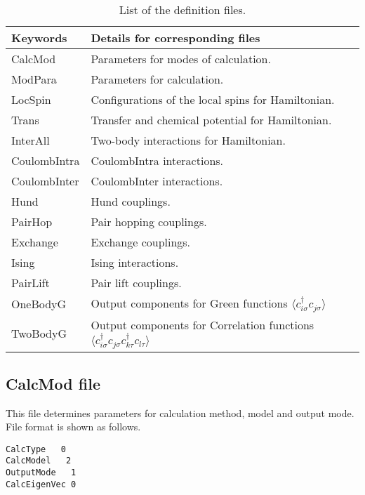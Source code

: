  \begin{table*}[h!]
\begin{center}
  \begin{tabular}{ll|} \hline
           Keywords     & Details for corresponding files       \\   \hline\hline
           CalcMod      &   Parameters for modes of calculation.  \\  \hline  
           ModPara       &  Parameters for calculation.        \\ \hline   
           LocSpin         &  Configurations of the local spins for Hamiltonian.         \\ 
           Trans       &   Transfer and chemical potential for Hamiltonian.  \\
           InterAll  &   Two-body interactions for Hamiltonian. \\  
           CoulombIntra  &   CoulombIntra interactions. \\  
           CoulombInter  &   CoulombInter  interactions. \\  
           Hund  &   Hund couplings. \\  
           PairHop  &  Pair hopping couplings. \\  
           Exchange  &  Exchange couplings. \\  
           Ising  &  Ising interactions. \\  
           PairLift  &   Pair lift couplings. \\  
           OneBodyG         &   Output components for Green functions $\langle c_{i\sigma}^{\dagger}c_{j\sigma}\rangle$           \\   
           TwoBodyG &   Output components for Correlation functions $\langle c_{i\sigma}^{\dagger}c_{j\sigma}c_{k\tau}^{\dagger}c_{l\tau}\rangle$  \\   \hline
  \end{tabular}
\end{center}
\caption{List of the definition files.}
\label{Table:Defs}
\end{table*}%

\newpage
\subsection{CalcMod file}
\label{Subsec:calcmod}
This file determines parameters for calculation method, model and output mode. File format is shown as follows.\\
\begin{minipage}{10cm}
\begin{screen}
\begin{verbatim}
CalcType   0
CalcModel   2
OutputMode   1
CalcEigenVec 0
\end{verbatim}
\end{screen}
\end{minipage}
\\
